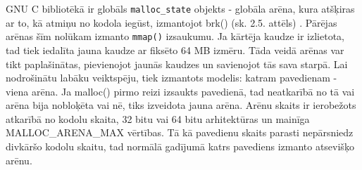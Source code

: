 GNU C bibliotēkā ir globāls \texttt{malloc\_state} objekts - globāla arēna, kura atšķiras ar to, kā atmiņu no kodola iegūst, izmantojot brk() (sk. 2.5. attēls) \cite{AMM}. 
Pārējas arēnas šīm nolūkam izmanto \texttt{mmap()} izsaukumu. 
Ja kārtēja kaudze ir izlietota, tad tiek iedalīta jauna kaudze ar fiksēto 64 MB izmēru.
Tāda veidā arēnas var tikt paplašinātas, pievienojot jaunās kaudzes un savienojot tās sava starpā.
Lai nodrošinātu labāku veiktspēju, tiek izmantots modelis: katram pavedienam - viena arēna. 
Ja malloc() pirmo reizi izsaukts pavedienā, tad neatkarībā no tā vai arēna bija nobloķēta vai nē, tiks izveidota jauna arēna.
Arēnu skaits ir ierobežots atkarībā no kodolu skaita, 32 bitu vai 64 bitu arhitektūras un mainīga MALLOC\_ARENA\_MAX vērtības.
Tā kā pavedienu skaits parasti nepārsniedz divkāršo kodolu skaitu, tad normālā gadījumā katrs pavediens izmanto atsevišķo arēnu. 



